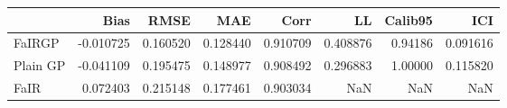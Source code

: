 \begin{tabular}{lrrrrrrr}
\toprule
{} &      Bias &      RMSE &       MAE &      Corr &        LL &  Calib95 &       ICI \\
\midrule
FaIRGP   & -0.010725 &  0.160520 &  0.128440 &  0.910709 &  0.408876 &  0.94186 &  0.091616 \\
Plain GP & -0.041109 &  0.195475 &  0.148977 &  0.908492 &  0.296883 &  1.00000 &  0.115820 \\
FaIR     &  0.072403 &  0.215148 &  0.177461 &  0.903034 &       NaN &      NaN &       NaN \\
\bottomrule
\end{tabular}
